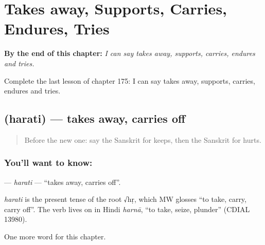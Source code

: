 
\chapter{Takes away, Supports, Carries, Endures, Tries}
\label{ch:sa-takes-away-supports-carries-endures-tries}

\begin{chapteropening}
\textbf{By the end of this chapter:} \emph{I can say takes away, supports, carries, endures and tries.}

Complete the last lesson of chapter 175: I can say takes away, supports, carries, endures and tries.
\end{chapteropening}

\section[\texorpdfstring{\sk{हरति} (harati)}{हरति (harati)}]{ (harati) — takes away, carries off}

\label{lesson:SA-C175-harati}



\begin{quote}
Before the new one: say the Sanskrit for keeps, then the Sanskrit for hurts.
\end{quote}

\subsection*{You'll want to know: }
\textbf{} — \emph{harati} — \textquotedblleft{}takes away, carries off\textquotedblright{}.

\begin{cousinweb}
\emph{harati} is the present tense of the root √hṛ, which MW glosses \textquotedblleft{}to take, carry, carry off\textquotedblright{}. The verb lives on in Hindi \emph{harnā}, \textquotedblleft{}to take, seize, plunder\textquotedblright{} (CDIAL 13980).
\end{cousinweb}

\begin{grammarlens}[title={What you've built}]
One more word for this chapter.
\end{grammarlens}

